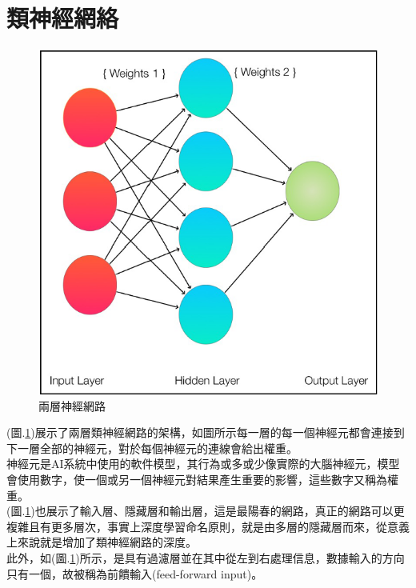 \documentclass[14pt,a4paper]{report}  %
\begin{document}
\section{類神經網絡}
\begin{figure}[hbt!]
\begin{center}
\includegraphics[scale=0.74]{兩層神經網路}
\caption{\Large 兩層神經網路}\label{兩層神經網路}
\end{center}
\end{figure}

 (圖.\ref{兩層神經網路})展示了兩層類神經網路的架構，如圖所示每一層的每一個神經元都會連接到下一層全部的神經元，對於每個神經元的連線會給出權重。\\

 神經元是AI系統中使用的軟件模型，其行為或多或少像實際的大腦神經元，模型會使用數字，使一個或另一個神經元對結果產生重要的影響，這些數字又稱為權重。\\

 (圖.\ref{兩層神經網路})也展示了輸入層、隱藏層和輸出層，這是最陽春的網路，真正的網路可以更複雜且有更多層次，事實上深度學習命名原則，就是由多層的隱藏層而來，從意義上來說就是增加了類神經網路的深度。\\

 此外，如(圖.\ref{兩層神經網路})所示，是具有過濾層並在​​其中從左到右處理信息，數據輸入的方向只有一個，故被稱為前饋輸入(feed-forward input)。\\
\end{document}
